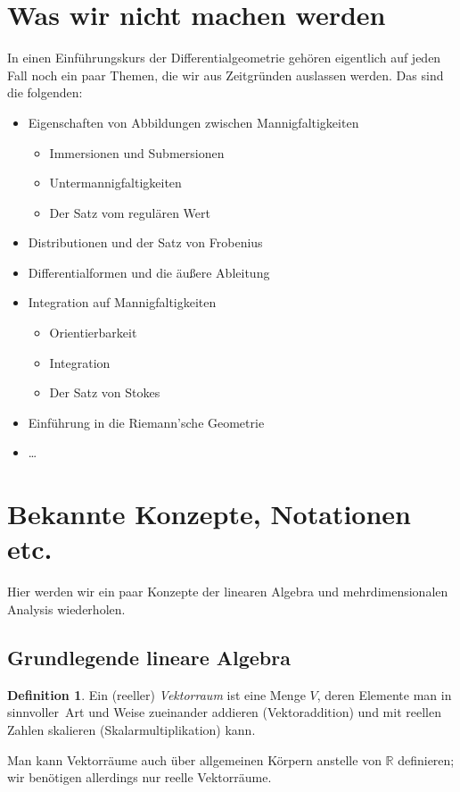 \documentclass[a4paper]{scrreprt}
\numberwithin{equation}{chapter}
\newcommand{\R}{\mathbb{R}}
\theoremstyle{definition}
\newtheorem{defn}{Definition}[section]
\begin{document}
\section{Was wir nicht machen werden}
In einen Einführungskurs der Differentialgeometrie gehören eigentlich auf jeden Fall noch ein paar Themen, die wir aus Zeitgründen auslassen werden. Das sind die folgenden:
\begin{itemize}
	\item Eigenschaften von Abbildungen zwischen Mannigfaltigkeiten
		\begin{itemize}
			\item Immersionen und Submersionen
			\item Untermannigfaltigkeiten
			\item Der Satz vom regulären Wert
		\end{itemize}
	\item Distributionen und der Satz von Frobenius
	\item Differentialformen und die äußere Ableitung
	\item Integration auf Mannigfaltigkeiten
		\begin{itemize}
			\item Orientierbarkeit
			\item Integration
			\item Der Satz von Stokes
		\end{itemize}
	\item Einführung in die Riemann'sche Geometrie
	\item \dots
\end{itemize}

\section{Bekannte Konzepte, Notationen etc.}
Hier werden wir ein paar Konzepte der linearen Algebra und mehrdimensionalen Analysis wiederholen.

\subsection{Grundlegende lineare Algebra}

\begin{defn}
	Ein (reeller) \emph{Vektorraum} ist eine Menge $V$, deren Elemente man in \glqq sinnvoller\grqq\ Art und Weise zueinander addieren (\glqq Vektoraddition\grqq) und mit reellen Zahlen skalieren (\glqq Skalarmultiplikation\grqq) kann.
\end{defn}
Man kann Vektorräume auch über allgemeinen Körpern anstelle von $\R$ definieren; wir benötigen allerdings nur reelle Vektorräume.
\end{document}
